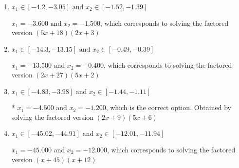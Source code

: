 \documentclass{extbook}[14pt]
\begin{document}
\begin{enumerate}
{\begin{enumerate}[label=\Alph*.]
$x_1 = -9.000 \text{ and } x_2 = -0.600$, which corresponds to solving the factored version $(x + 9)(10x + 6)$
\item \( x_1 \in [-4.2, -3.05] \text{ and } x_2 \in [-1.52, -1.39] \)

$x_1 = -3.600 \text{ and } x_2 = -1.500$, which corresponds to solving the factored version $(5x + 18)(2x + 3)$
\item \( x_1 \in [-14.3, -13.15] \text{ and } x_2 \in [-0.49, -0.39] \)

$x_1 = -13.500 \text{ and } x_2 = -0.400$, which corresponds to solving the factored version $(2x + 27)(5x + 2)$
\item \( x_1 \in [-4.83, -3.98] \text{ and } x_2 \in [-1.44, -1.11] \)

* $x_1 = -4.500 \text{ and } x_2 = -1.200$, which is the correct option. Obtained by solving the factored version $(2x + 9)(5x + 6)$
\item \( x_1 \in [-45.02, -44.91] \text{ and } x_2 \in [-12.01, -11.94] \)

$x_1 = -45.000 \text{ and } x_2 = -12.000$, which corresponds to solving the factored version $(x + 45)(x + 12)$
\end{enumerate}

}
\end{enumerate}
\end{document}
